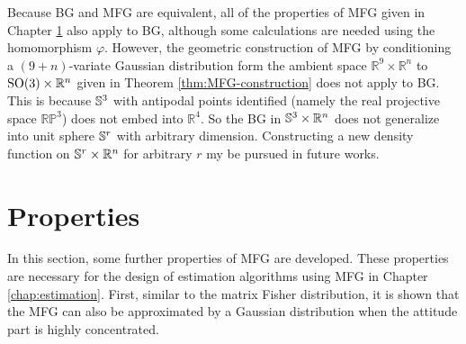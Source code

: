 Because BG and MFG are equivalent, all of the properties of MFG given in Chapter \ref{section:MFG-property} also apply to BG, although some calculations are needed using the homomorphism $\varphi$.
However, the geometric construction of MFG by conditioning a $(9+n)$-variate Gaussian distribution form the ambient space $\mathbb{R}^9\times\mathbb{R}^n$ to $\mathrm{SO}(3)\times\mathbb{R}^n$ given in Theorem \ref{thm:MFG-construction} does not apply to BG.
This is because $\mathbb{S}^3$ with antipodal points identified (namely the real projective space $\mathbb{RP}^3$) does not embed into $\mathbb{R}^4$.
So the BG in $\mathbb{S}^3\times \mathbb{R}^n$ does not generalize into unit sphere $\mathbb{S}^r$ with arbitrary dimension.
Constructing a new density function on $\mathbb{S}^r\times \mathbb{R}^n$ for arbitrary $r$ my be pursued in future works.

\section{Properties} \label{section:MFG-property}

In this section, some further properties of MFG are developed.
These properties are necessary for the design of estimation algorithms using MFG in Chapter \ref{chap:estimation}.
First, similar to the matrix Fisher distribution, it is shown that the MFG can also be approximated by a Gaussian distribution when the attitude part is highly concentrated.

